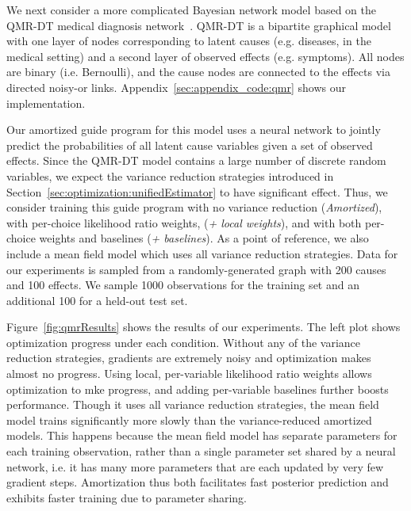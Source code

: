 We next consider a more complicated Bayesian network model based on the QMR-DT medical diagnosis network~\cite{QMR}. QMR-DT is a bipartite graphical model with one layer of nodes corresponding to latent causes (e.g. diseases, in the medical setting) and a second layer of observed effects (e.g. symptoms). All nodes are binary (i.e. Bernoulli), and the cause nodes are connected to the effects via directed noisy-or links. Appendix~\ref{sec:appendix_code:qmr} shows our implementation.

Our amortized guide program for this model uses a neural network to jointly predict the probabilities of all latent cause variables given a set of observed effects. Since the QMR-DT model contains a large number of discrete random variables, we expect the variance reduction strategies introduced in Section~\ref{sec:optimization:unifiedEstimator} to have significant effect.
Thus, we consider training this guide program with no variance reduction (\emph{Amortized}), with per-choice likelihood ratio weights, (\emph{+ local weights}), and with both per-choice weights and baselines (\emph{+ baselines}). As a point of reference, we also include a mean field model which uses all variance reduction strategies.
Data for our experiments is sampled from a randomly-generated graph with 200 causes and 100 effects. We sample 1000 observations for the training set and an additional 100 for a held-out test set.

Figure~\ref{fig:qmrResults} shows the results of our experiments. The left plot shows optimization progress under each condition. Without any of the variance reduction strategies, gradients are extremely noisy and optimization makes almost no progress. Using local, per-variable likelihood ratio weights allows optimization to mke progress, and adding per-variable baselines further boosts performance. Though it uses all variance reduction strategies, the mean field model trains significantly more slowly than the variance-reduced amortized models. This happens because the mean field model has separate parameters for each training observation, rather than a single parameter set shared by a neural network, i.e. it has many more parameters that are each updated by very few gradient steps. Amortization thus both facilitates fast posterior prediction and exhibits faster training due to parameter sharing.

